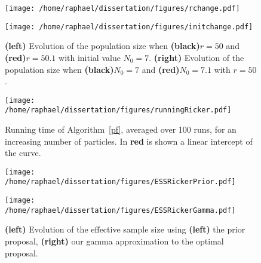 \documentclass[12pt]{article}
\begin{document}
	\begin{figure}[htb]
		\centering
		\begin{minipage}{0.4\textwidth}
			\centering
			\texttt{[image: /home/raphael/dissertation/figures/rchange.pdf]}
		\end{minipage}
		\begin{minipage}{0.4\textwidth}
			\centering
			\texttt{[image: /home/raphael/dissertation/figures/initchange.pdf]}
		\end{minipage}
		\caption{\textbf{(left)} Evolution of the population size when \textbf{(black)}$r=50$ and \textbf{(red)}$r=50.1$ with initial value $N_0=7$. \textbf{(right)} Evolution of the population size when \textbf{(black)}$N_0=7$ and \textbf{(red)}$N_0=7.1$ with $r=50$.}
		\label{fig:chaos}
	\end{figure}

	\begin{figure}[htb]
		\centering
		\begin{minipage}{0.4\textwidth}
			\centering
			\texttt{[image: /home/raphael/dissertation/figures/runningRicker.pdf]}
		\end{minipage}
		\caption{Running time of Algorithm~\ref{pf}, averaged over 100 runs, for an increasing number of particles. In \textbf{red} is shown a linear intercept of the curve.}
		\label{fig:runningRicker}
	\end{figure}

	\begin{figure}[htb]
		\centering
		\begin{minipage}{0.4\textwidth}
			\centering
			\texttt{[image: /home/raphael/dissertation/figures/ESSRickerPrior.pdf]}
		\end{minipage}
		\begin{minipage}{0.4\textwidth}
			\centering
			\texttt{[image: /home/raphael/dissertation/figures/ESSRickerGamma.pdf]}
		\end{minipage}
		\caption{\textbf{(left)} Evolution of the effective sample size using \textbf{(left)} the prior proposal, \textbf{(right)} our gamma approximation to the optimal proposal.}
		\label{fig:essRicker}
	\end{figure}
	
\end{document}
